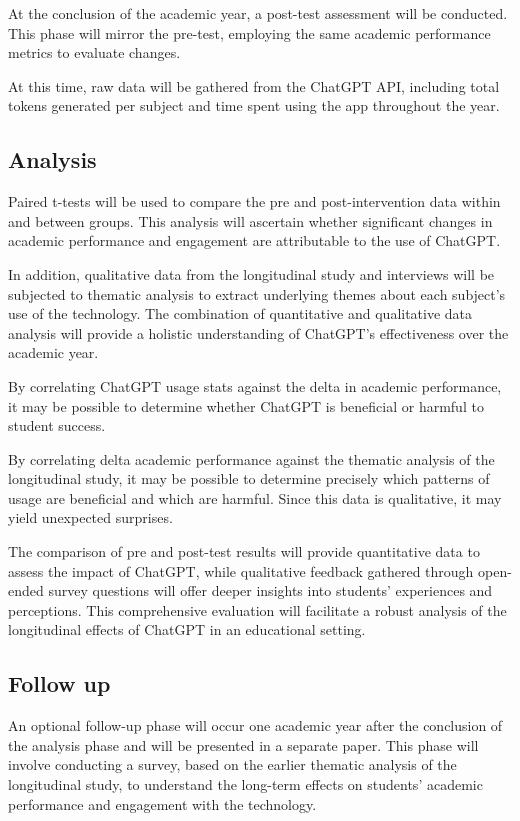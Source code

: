 \documentclass[12pt]{article}
\begin{document}
At the conclusion of the academic year, a post-test assessment will be conducted. This phase will mirror the pre-test, employing the same academic performance metrics to evaluate changes. 

At this time, raw data will be gathered from the ChatGPT API, including total tokens generated per subject and time spent using the app throughout the year.

\subsection{Analysis}
 
Paired t-tests will be used to compare the pre and post-intervention data within and between groups. This analysis will ascertain whether significant changes in academic performance and engagement are attributable to the use of ChatGPT. 

In addition, qualitative data from the longitudinal study and interviews will be subjected to thematic analysis to extract underlying themes about each subject's use of the technology. The combination of quantitative and qualitative data analysis will provide a holistic understanding of ChatGPT's effectiveness over the academic year. \cite{cresswell}

By correlating ChatGPT usage stats against the delta in academic performance, it may be possible to determine whether ChatGPT is beneficial or harmful to student success. 

By correlating delta academic performance against the thematic analysis of the longitudinal study, it may be possible to determine precisely which patterns of usage are beneficial and which are harmful. Since this data is qualitative, it may yield unexpected surprises.

The comparison of pre and post-test results will provide quantitative data to assess the impact of ChatGPT, while qualitative feedback gathered through open-ended survey questions will offer deeper insights into students' experiences and perceptions. This comprehensive evaluation will facilitate a robust analysis of the longitudinal effects of ChatGPT in an educational setting.

\subsection{Follow up}

An optional follow-up phase will occur one academic year after the conclusion of the analysis phase and will be presented in a separate paper. This phase will involve conducting a survey, based on the earlier thematic analysis of the longitudinal study, to understand the long-term effects on students' academic performance and engagement with the technology. 
\end{document}
